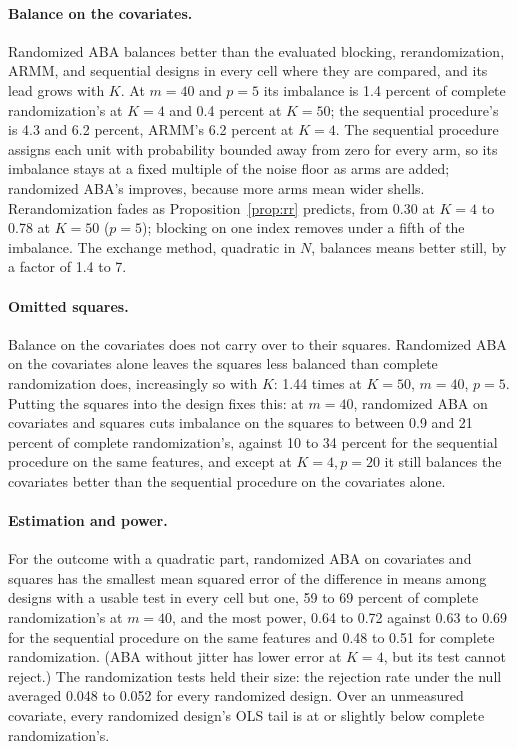 \documentclass[11pt]{article}
\theoremstyle{remark}
\begin{document}
\paragraph{Balance on the covariates.} Randomized ABA balances better than
the evaluated blocking, rerandomization, ARMM, and sequential designs
in every cell where they are compared, and its lead grows with $K$.
At $m = 40$ and $p = 5$ its imbalance is 1.4 percent of complete
randomization's at $K = 4$ and 0.4 percent at $K = 50$; the sequential
procedure's is 4.3 and 6.2 percent, ARMM's 6.2 percent at $K = 4$. The
sequential procedure assigns each unit with probability bounded away from
zero for every arm, so its imbalance stays at a fixed multiple of the noise
floor as arms are added; randomized ABA's improves, because more arms mean
wider shells. Rerandomization fades as Proposition~\ref{prop:rr} predicts,
from 0.30 at $K = 4$ to 0.78 at $K = 50$ ($p = 5$); blocking on one index
removes under a fifth of the imbalance. The exchange method, quadratic in
$N$, balances means better still, by a factor of 1.4 to 7.

\paragraph{Omitted squares.} Balance on the covariates does not carry over
to their squares. Randomized ABA on the covariates alone leaves the squares
less balanced than complete randomization does, increasingly so with $K$: 1.44
times at $K = 50$, $m = 40$, $p = 5$. Putting the squares into the design
fixes this: at $m = 40$, randomized ABA on covariates and squares cuts
imbalance on the squares to between 0.9 and 21 percent of complete
randomization's, against 10 to 34 percent for the sequential procedure on the
same features, and except at $K = 4, p = 20$ it still balances the
covariates better than the sequential procedure on the covariates alone.

\paragraph{Estimation and power.} For the outcome with a quadratic part,
randomized ABA on covariates and squares has the smallest mean squared error
of the difference in means among designs with a usable test in every cell
but one, 59 to 69 percent of complete randomization's at $m = 40$, and the
most power, 0.64 to 0.72 against 0.63 to 0.69 for the sequential procedure on
the same features and 0.48 to 0.51 for complete randomization. (ABA without
jitter has lower error at $K = 4$, but its test cannot reject.) The randomization tests held their
size: the rejection rate under the null averaged 0.048 to 0.052 for every
randomized design. Over an unmeasured covariate, every randomized design's OLS tail is
at or slightly below complete randomization's.
\end{document}
